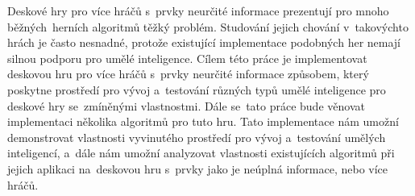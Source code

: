 \documentclass[12pt]{report}
\begin{document}

Deskové hry pro více hráčů s~prvky neurčité informace prezentují pro mnoho
běžných~herních algoritmů těžký problém. Studování jejich chování v~takovýchto hrách
je často nesnadné, protože existující implementace podobných her nemají silnou
podporu pro umělé inteligence. Cílem této práce je implementovat deskovou hru
pro více hráčů s~prvky neurčité informace způsobem, který poskytne prostředí
pro vývoj a~testování různých typů umělé inteligence pro deskové hry
se~zmíněnými vlastnostmi. Dále se~tato práce bude věnovat implementaci
několika algoritmů pro tuto hru. Tato implementace nám umožní demonstrovat
vlastnosti vyvinutého prostředí pro vývoj a~testování umělých inteligencí,
a~dále nám umožní analyzovat vlastnosti existujících algoritmů
při jejich aplikaci na~deskovou hru s~prvky jako je neúplná informace, nebo
více hráčů.
\end{document}

